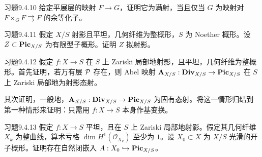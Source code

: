 \begin{origstatement}{习题}{9.4.10}\label{ch09s04:9.4.10}
给定平展层的映射 $F\to G$，证明它为满射，当且仅当 $G$ 为映射对 $F\times_GF\rightrightarrows F$ 的余等化子。
\end{origstatement}
\begin{origstatement}{习题}{9.4.11}\label{ch09s04:9.4.11}
假定 $X/S$ 射影且平坦，几何纤维为整概形，$S$ 为 Noether 概形。设 $Z\subset\mathbf{Pic}_{X/S}$ 为有限型子概形。证明 $Z$ 拟射影。
\end{origstatement}
\begin{origstatement}{习题}{9.4.12}\label{ch09s04:9.4.12}
假定 $f:X\to S$ 在 $S$ 上 Zariski 局部地射影，且平坦，几何纤维为整概形。首先证明，若万有层 $\mathcal P$ 存在，则 Abel 映射 $\mathbf A_{X/S}:\mathbf{Div}_{X/S}\to\mathbf{Pic}_{X/S}$ 在 $S$ 上 Zariski 局部地为射影态射。

其次证明，一般地，$\mathbf A_{X/S}:\mathbf{Div}_{X/S}\to\mathbf{Pic}_{X/S}$ 为固有态射。将这一情形归结到第一种情形来证明：只需用 $f:X\to S$ 本身作基变换。
\end{origstatement}
\begin{origstatement}{习题}{9.4.13}\label{ch09s04:9.4.13}
假定 $f:X\to S$ 平坦，且在 $S$ 上 Zariski 局部地射影。假定其几何纤维 $X_k$ 为整曲线，算术亏格 $\dim H^1(\mathcal O_{X_k})$ 至少为 $1$。设 $X_0\subset X$ 为 $X/S$ 光滑的开子概形。证明存在自然闭嵌入 $A:X_0\hookrightarrow\mathbf{Pic}_{X/S}$。
\end{origstatement}
